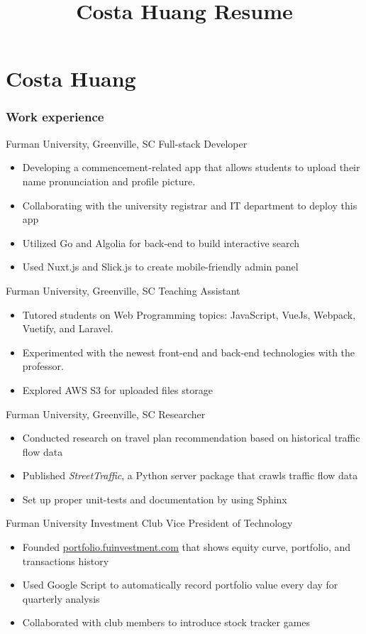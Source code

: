 \documentclass{tccv}
\title{Costa Huang Resume}
\begin{document}
\part{Costa Huang}

\section{Work experience}

\begin{eventlist}

     {Furman University, Greenville, SC}
     {Full-stack Developer}
\begin{itemize}
    \item Developing a commencement-related app that allows students to 
upload their name pronunciation and profile picture.
    \item Collaborating with the university registrar and IT department to deploy this app
    \item Utilized Go and Algolia for back-end to build interactive
search
    \item Used Nuxt.js and Slick.js to create mobile-friendly admin panel
\end{itemize}

     {Furman University, Greenville, SC}
     {Teaching Assistant}
\begin{itemize}
    \item Tutored students on Web Programming topics: JavaScript, VueJs,
Webpack, Vuetify, and Laravel.
    \item Experimented with the newest front-end and back-end
technologies with the professor.
    \item Explored AWS S3 for uploaded files storage
\end{itemize}

     {Furman University, Greenville, SC}
     {Researcher}
\begin{itemize}
    \item Conducted research on travel plan recommendation based on
historical traffic flow data
    \item Published \textit{StreetTraffic}, a Python server package that crawls traffic flow data 
    \item Set up proper unit-tests and documentation by using Sphinx
\end{itemize}

     {Furman University Investment Club}
     {Vice President of Technology}
\begin{itemize}
    \item Founded \href{http://portfolio.fuinvestment.com/}{portfolio.fuinvestment.com} that shows equity
curve, portfolio, and transactions history
    \item Used Google Script to automatically record portfolio value every
day for quarterly analysis
    \item Collaborated with club members to introduce stock tracker games
\end{itemize}


\end{eventlist}
\end{document}
